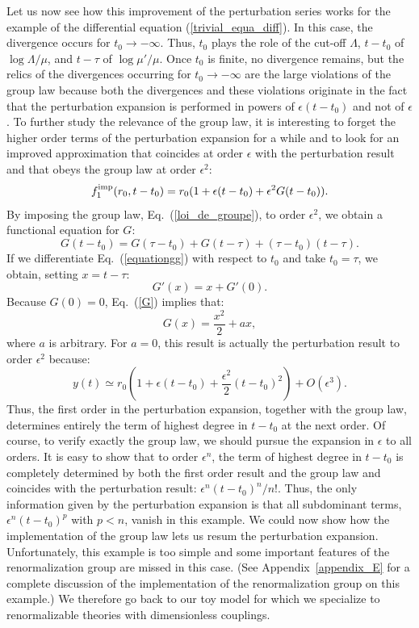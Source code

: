 \documentclass[floatfix,twocolumn,preprintnumbers,amsmath,amssymb,prb]{revtex4}
\begin{document}
Let us now see how this improvement of the perturbation series works for the example of
the differential equation (\ref{trivial_equa_diff}). In this case, the divergence occurs for
$t_0\to-\infty$. Thus, $t_0$ plays the role of the cut-off
$\Lambda$, $t-t_0$ of $\log\Lambda/\mu$, and 
$t-\tau$ of $\log\mu'/\mu$. Once $t_0$ is finite, no divergence
remains, but the relics of the divergences occurring for
$t_0\to-\infty$ are the large violations of the group law because
both the divergences and these violations originate in the fact
that the perturbation expansion is performed in powers of
$\epsilon(t-t_0)$ and not of $\epsilon$. To further study the
relevance of the group law, it is interesting to forget the higher
order terms of the perturbation expansion for a while and to look
for an improved approximation that coincides at order
$\epsilon$ with the perturbation result and that obeys the
group law at order
$\epsilon^2$:
\begin{equation}
f_1^{\rm imp}(r_0,t-t_0)=r_0(1+\epsilon(t-t_0)+\epsilon^2
G(t-t_0)).
\label{fimp}
\end{equation}
By imposing the group law, Eq.~(\ref{loi_de_groupe}), to order
$\epsilon^2$, we obtain a functional equation for $G$:
\begin{equation}
G(t-t_0)=G(\tau-t_0)+ G(t-\tau) + (\tau-t_0)(t-\tau).
\label{equationgg}
\end{equation}
If we differentiate Eq.~(\ref{equationgg}) with respect to $t_0$
and take $t_0=\tau$, we obtain, setting $x=t-\tau$:
\begin{equation}
G'(x)=x+G'(0).
\label{G}
\end{equation}
Because $G(0)=0$, Eq.~(\ref{G}) implies that:
\begin{equation}
G(x)=\frac{x^2}{2}+ a x,
\label{solution_fimp}
\end{equation}
where $a$ is arbitrary. For $a=0$, this result is
actually the perturbation result to order $\epsilon^2$ because:
\begin{equation}
y(t)\simeq r_0 (1+\epsilon(t-t_0) + \frac{\epsilon^2}{2}
(t-t_0)^2) + O(\epsilon^3).
\end{equation}
Thus, the first order in the perturbation expansion, together with
the group law, determines entirely the term of highest degree in
$t-t_0$ at the next order. Of course, to verify exactly the
group law, we should pursue the expansion in $\epsilon$ to all
orders. It is easy to show that to order
$\epsilon^n$, the term of highest degree in $t-t_0$ is completely
determined by both the first order result and the group law and
coincides with the perturbation result: $\epsilon^n(t-t_0)^n/n!$.
Thus, the only information given by the perturbation expansion is
that all subdominant terms, $\epsilon^n(t-t_0)^p$ with $p<n$, 
vanish in this example. We could now show how the
implementation of the group law lets us resum the perturbation
expansion. Unfortunately, this example is too simple and some
important features of the renormalization group are missed in this
case. (See Appendix~\ref{appendix_E} for a complete discussion of
the implementation of the renormalization group on this example.)
We therefore go back to our toy model for which we specialize to
renormalizable theories with dimensionless couplings. 
\end{document}
